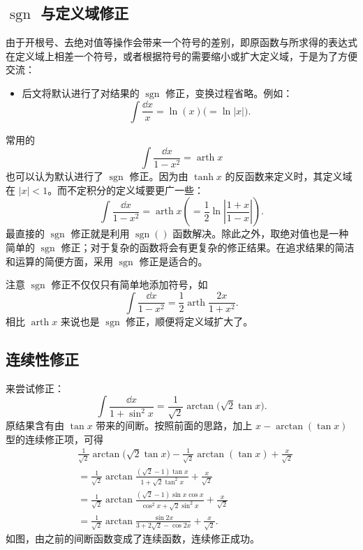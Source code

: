 \subsection*{$\operatorname{sgn}$ 与定义域修正}

由于开根号、去绝对值等操作会带来一个符号的差别，即原函数与所求得的表达式在定义域上相差一个符号，或者根据符号的需要缩小或扩大定义域，于是为了方便交流：
\begin{itemize}
	\item 后文将默认进行了对结果的 $\operatorname{sgn}$ 修正，变换过程省略。例如：
	\[
	\int \frac{\dd x}{x}=\ln(x)\bigl(=\ln|x|\bigr).
		\]
\end{itemize}


\begin{example}
	常用的
	\[
	\int \frac{\dd x}{1-x^2}=\operatorname{arth}x
	\]
	也可以认为默认进行了 $\operatorname{sgn}$ 修正。因为由 $\tanh x$ 的反函数来定义时，其定义域在 $|x|<1$。而不定积分的定义域要更广一些：
	\[
	\int\frac{\dd x}{1-x^2}=\operatorname{arth}x
	\left(=\frac12\ln\left|\frac{1+x}{1-x}\right|\right). 
	\]
	最直接的 $\operatorname{sgn}$ 修正就是利用 $\operatorname{sgn}()$ 函数解决。除此之外，取绝对值也是一种简单的 $\operatorname{sgn}$ 修正；对于复杂的函数将会有更复杂的修正结果。在追求结果的简洁和运算的简便方面，采用 $\operatorname{sgn}$ 修正是适合的。
	
	注意 $\operatorname{sgn}$ 修正不仅仅只有简单地添加符号，如
	\[
	\int\frac{\dd x}{1-x^2}
	=\frac12\operatorname{arth}\frac{2x}{1+x^2}. 
	\]
	相比 $\operatorname{arth}x$ 来说也是 $\operatorname{sgn}$ 修正，顺便将定义域扩大了。
\end{example}
\subsection*{连续性修正}
\begin{example}
	来尝试修正：
	\[
	\int\frac{\dd x}{1+\sin^2x}
	=\frac{1}{\sqrt2}\arctan\bigl(\sqrt2\tan x\bigr).
	\]
	原结果含有由 $\tan x$ 带来的间断。按照前面的思路，加上
	$x-\arctan(\tan x)$ 型的连续修正项，可得
	\[
	\begin{aligned}
		&\frac{1}{\sqrt2}\arctan\bigl(\sqrt2\tan x\bigr)
		-\frac{1}{\sqrt2}\arctan(\tan x)+\frac{x}{\sqrt2} \\
		&=\frac{1}{\sqrt2}\arctan
		\frac{(\sqrt2-1)\tan x}{1+\sqrt2\tan^2x}+\frac{x}{\sqrt2} \\
		&=\frac{1}{\sqrt2}\arctan
		\frac{(\sqrt2-1)\sin x\cos x}{\cos^2x+\sqrt2\sin^2x}+\frac{x}{\sqrt2} \\
		&=\frac{1}{\sqrt2}\arctan
		\frac{\sin 2x}{3+2\sqrt2-\cos 2x}+\frac{x}{\sqrt2}.
	\end{aligned}
	\]
	如图，由之前的间断函数变成了连续函数，连续修正成功。
\end{example}

